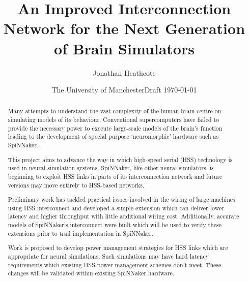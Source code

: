 \documentclass[a4paper,12pt,titlepage]{report}
\title{An Improved Interconnection Network for the Next Generation of Brain
Simulators}
\author{Jonathan Heathcote}
\date{The University of Manchester}
\date{Draft \today}
\begin{document}
	
	\maketitle
	
	\begin{abstract}
		
		Many attempts to understand the vast complexity of the human brain centre on
		simulating models of its behaviour. Conventional supercomputers have failed
		to provide the necessary power to execute large-scale models of the brain's
		function leading to the development of special purpose `neuromorphic'
		hardware such as SpiNNaker.
		
		This project aims to advance the way in which high-speed serial (HSS)
		technology is used in neural simulation systems. SpiNNaker, like other
		neural simulators, is beginning to exploit HSS links in parts of its
		interconnection network and future versions may move entirely to HSS-based
		networks.
		
		Preliminary work has tackled practical issues involved in the wiring of
		large machines using HSS interconnect and developed a simple extension which
		can deliver lower latency and higher throughput with little additional
		wiring cost. Additionally, accurate models of SpiNNaker's interconnect were
		built which will be used to verify these extensions prior to trail
		implementation in SpiNNaker.
		
		Work is proposed to develop power management strategies for HSS links which
		are appropriate for neural simulations. Such simulations may have hard
		latency requirements which existing HSS power management schemes don't meet.
		These changes will be validated within existing SpiNNaker hardware.
		
	\end{abstract}
	
	\tableofcontents
	\listoffigures
	
	
	
	
	
	
	
	
	
	
\end{document}
